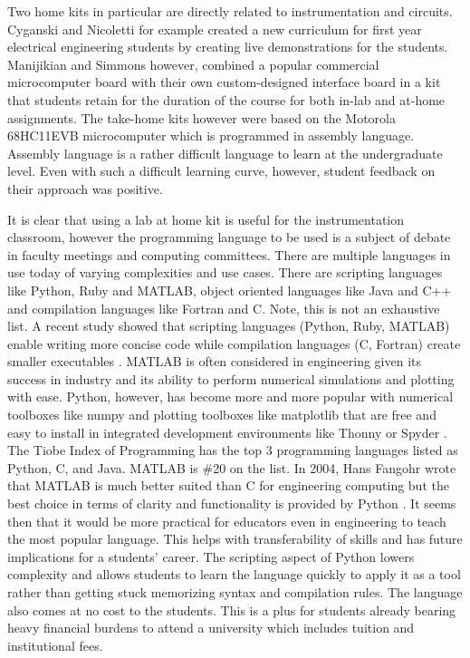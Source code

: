 Two home kits in particular are directly related to instrumentation
and circuits. Cyganski and Nicoletti\cite{LabAtHome4_EE} for example
created a new curriculum for first year electrical engineering
students by creating live demonstrations for the students. Manijikian
and Simmons\cite{LabAtHome2_EE} however, combined a popular commercial
microcomputer board with their own custom-designed interface board in
a kit that students retain for the duration of the course for both
in-lab and at-home assignments. The take-home kits however were based
on the Motorola 68HC11EVB microcomputer which is programmed in
assembly language. Assembly language is a rather difficult language to
learn at the undergraduate level. Even with such a difficult learning
curve, however, student feedback on their approach was
positive\cite{LabAtHome2_EE}. 

It is clear that using a lab at home kit is useful for the
instrumentation classroom, however the programming language to be used
is a subject of debate in faculty meetings and computing
committees. There are multiple languages in use today of varying
complexities and use cases. There are scripting languages like Python,
Ruby and MATLAB, object oriented languages like Java and C++ and
compilation languages like Fortran and C. Note, this is not an
exhaustive list. A recent study showed that scripting languages
(Python, Ruby, MATLAB) enable writing more concise code while
compilation languages (C, Fortran) create smaller
executables \cite{codetype}. MATLAB is often considered in engineering
given its success in industry and its ability to perform numerical
simulations and plotting with ease. Python, however, has become more
and more popular with numerical toolboxes like numpy and plotting
toolboxes like matplotlib that are free and easy to install in
integrated development environments like Thonny or
Spyder \cite{IDE}. The Tiobe Index of Programming\cite{Tiobe} has the
top 3 programming languages listed as Python, C, and Java. MATLAB
is \#20 on the list. In 2004, Hans Fangohr wrote that MATLAB is much
better suited than C for engineering computing but the best choice in
terms of clarity and functionality is provided by
Python \cite{CodeComparison}. It seems then that it would be more
practical for educators even in engineering to teach the most popular
language. This helps with transferability of skills and has future
implications for a students' career. The scripting aspect of Python
lowers complexity and allows students to learn the language quickly to
apply it as a tool rather than getting stuck memorizing syntax and
compilation rules. The language also comes at no cost to the
students. This is a plus for students already bearing heavy financial
burdens to attend a university which includes tuition and
institutional fees. 

